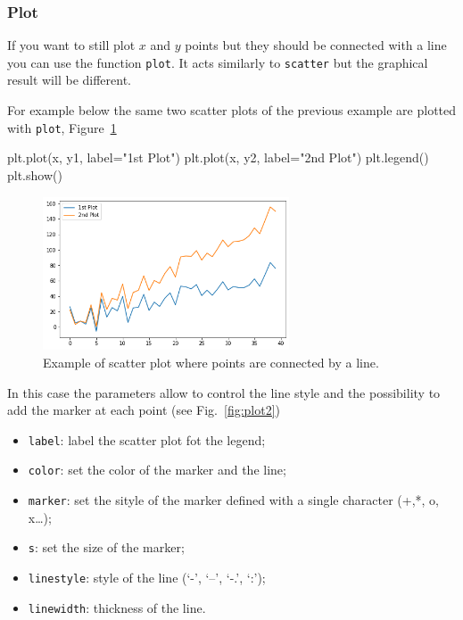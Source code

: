 \subsubsection{Plot}\label{plot}

If you want to still plot \(x\) and \(y\) points but they should be connected with a line you can use the function \texttt{plot}. It acts similarly to \texttt{scatter} but the graphical result will be different.

For example below the same two scatter plots of the previous example are plotted with \texttt{plot}, Figure~\ref{fig:plot1}

\begin{ipython}
plt.plot(x, y1, label="1st Plot")
plt.plot(x, y2, label="2nd Plot")
plt.legend()
plt.show()
\end{ipython}

\begin{figure}[htb]
	\centering
	\includegraphics[width=0.65\textwidth]{figures/plot1}
	\caption{Example of scatter plot where points are connected by a line.}
	\label{fig:plot1}
\end{figure}

In this case the parameters allow to control the line style and the possibility to add the marker at each point (see Fig.~\ref{fig:plot2})

\begin{itemize}
	\tightlist
	\item
	\texttt{label}: label the scatter plot fot the legend;
	\item
	\texttt{color}: set the color of the marker and the line;
	\item
	\texttt{marker}: set the sityle of the marker defined with a single
	character (+,*, o, x\ldots{});
	\item
	\texttt{s}: set the size of the marker;
	\item
	\texttt{linestyle}: style of the line (`-', `--', `-.', `:');
	\item
	\texttt{linewidth}: thickness of the line.
\end{itemize}

